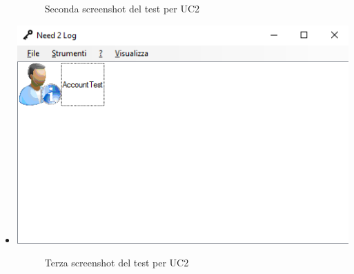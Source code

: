 \documentclass[a4paper,10pt]{report}
\begin{document}
\begin{itemize}
{\begin{center}
							\end{center}
						\begin{figure}[!h]
								\caption{Seconda screenshot del test per UC2}
							\end{figure}}
					\item[] {
						\begin{center}
							\includegraphics[scale=1]{immagini/test/testUC2_3.png}
							\end{center}
						\begin{figure}[!h]
								\caption{Terza screenshot del test per UC2}
							\end{figure}}
					\end{itemize}
			\newpage
\end{document}
